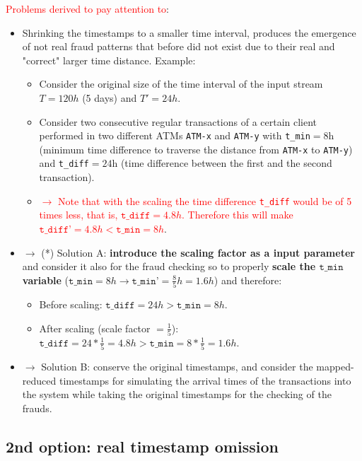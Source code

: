 \documentclass{article}
\begin{document}
\textcolor{red}{Problems derived to pay attention to}:
\begin{itemize}
  \item Shrinking the timestamps to a smaller time interval, produces the emergence of not real fraud patterns that before did not exist due to their real and "correct" larger time distance. Example:
  \begin{itemize}
  \item Consider the original size of the time interval of the input stream $T=120h$ (5 days) and $T'=24h$.
  \item Consider two consecutive regular transactions of a certain client performed in two different ATMs \texttt{ATM-x} and \texttt{ATM-y} with \texttt{t\_min}$=8$h (minimum time difference to traverse the distance from \texttt{ATM-x} to \texttt{ATM-y}) and \texttt{t\_diff}$=24$h (time difference between the first and the second transaction). 
  \item \textcolor{red}{$\rightarrow$ Note that with the scaling the time difference \texttt{t\_diff} would be of 5 times less, that is, $\texttt{t\_diff}=4.8h$. Therefore this will make $\texttt{t\_diff'}=4.8h < \texttt{t\_min}=8h$}.
  \end{itemize}
  \item $\rightarrow$ (*) Solution A: \textbf{introduce the scaling factor as a input parameter} and consider it also for the fraud checking so to properly \textbf{scale the $\texttt{t\_min}$ variable} ($\texttt{t\_min}=8h \rightarrow \texttt{t\_min'}=\frac{8}{5}h=1.6h$) and therefore: 
  \begin{itemize}
    \item Before scaling: $\texttt{t\_diff}=24h > \texttt{t\_min}=8h$.
    \item After scaling (scale factor $=\frac{1}{5}$): $\texttt{t\_diff}=24*\frac{1}{5}=4.8h > \texttt{t\_min}=8*\frac{1}{5}=1.6h$.
  \end{itemize}
  \item $\rightarrow$ Solution B: conserve the original timestamps, and consider the mapped-reduced timestamps for simulating the arrival times of the transactions into the system while taking the original timestamps for the checking of the frauds.
\end{itemize}



\subsection{2nd option: real timestamp omission}
\end{document}

